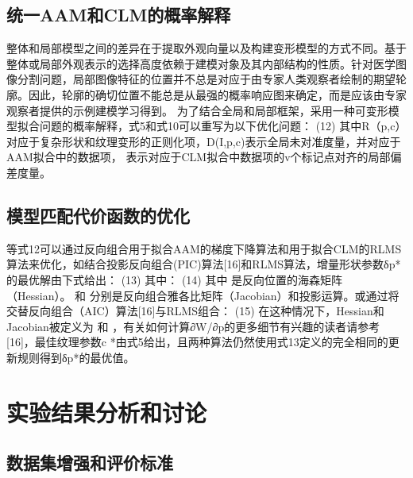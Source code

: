 \subsection{统一AAM和CLM的概率解释}
整体和局部模型之间的差异在于提取外观向量以及构建变形模型的方式不同。基于整体或局部外观表示的选择高度依赖于建模对象及其内部结构的性质。针对医学图像分割问题，局部图像特征的位置并不总是对应于由专家人类观察者绘制的期望轮廓。因此，轮廓的确切位置不能总是从最强的概率响应图来确定，而是应该由专家观察者提供的示例建模学习得到。
为了结合全局和局部框架，采用一种可变形模型拟合问题的概率解释，式5和式10可以重写为以下优化问题：
    (12)
其中R（p,c）对应于复杂形状和纹理变形的正则化项，D(I,p,c)表示全局未对准度量，并对应于AAM拟合中的数据项， 表示对应于CLM拟合中数据项的v个标记点对齐的局部偏差度量。

\subsection{模型匹配代价函数的优化} 
等式12可以通过反向组合用于拟合AAM的梯度下降算法和用于拟合CLM的RLMS算法来优化，如结合投影反向组合(PIC)算法[16]和RLMS算法，增量形状参数δp*的最优解由下式给出：
	  	(13)
其中：
	  	(14)
其中  是反向位置的海森矩阵（Hessian）。  和  分别是反向组合雅各比矩阵（Jacobian）和投影运算。或通过将交替反向组合（AIC）算法[16]与RLMS组合：
 (15)
在这种情况下，Hessian和Jacobian被定义为  和  ，有关如何计算∂W/∂p的更多细节有兴趣的读者请参考[16]，最佳纹理参数c *由式5给出，且两种算法仍然使用式13定义的完全相同的更新规则得到δp*的最优值。

\section{实验结果分析和讨论}
\subsection{数据集增强和评价标准}

